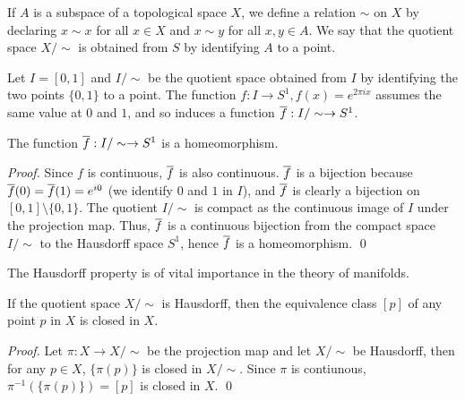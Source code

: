 If $A$ is a subspace of a topological space $X$, we define a relation $\sim$ on $X$ by declaring $x \sim x$ for all $x \in X$ and $x \sim y$ for all $x,y \in A$. We say that the quotient space $X/\sim$ is obtained from $S$ by identifying $A$ to a point. 
\begin{example}
    Let $I=[0,1]$ and $I/\sim$ be the quotient space obtained from $I$ by identifying the two points $\{0,1\}$ to a point. The function $f:I \to S^1, f(x) = e^{2\pi ix}$ assumes the same value at $0$ and $1$, and so induces a function $\overline{f}:I/\sim \to S^1$.
\end{example}
\begin{proposition}
    The function $\overline{f}:I/\sim \to S^1$ is a homeomorphism. 
\end{proposition}
\begin{proof}
    Since $f$ is continuous, $\overline{f}$ is also continuous. $\overline{f}$ is a bijection because $\overline{f}(0)=\overline{f}(1)=e^{i0}$ (we identify $0$ and $1$ in $I$), and $\overline{f}$ is clearly a bijection on $[0,1] \setminus \{0,1\}$. 
    The quotient $I/\sim$ is compact as the continuous image of $I$ under the projection map. Thus, $\overline{f}$ is a continuous bijection from the compact space $I/\sim$ to the Hausdorff space $S^1$, hence $\overline{f}$ is a homeomorphism. \qed 
\end{proof}

The Hausdorff property is of vital importance in the theory of manifolds. 
\begin{proposition}
    If the quotient space $X/\sim$ is Hausdorff, then the equivalence class $[p]$ of any point $p$ in $X$ is closed in $X$. 
\end{proposition}
\begin{proof}
    Let $\pi:X \to X/\sim$ be the projection map and let $X/\sim$ be Hausdorff, then for any $p \in X$, $\{\pi(p)\}$ is closed in $X/\sim$. Since $\pi$ is contiunous, $\pi^{-1}(\{\pi(p)\}) = [p]$ is closed in $X$. \qed 
\end{proof}
